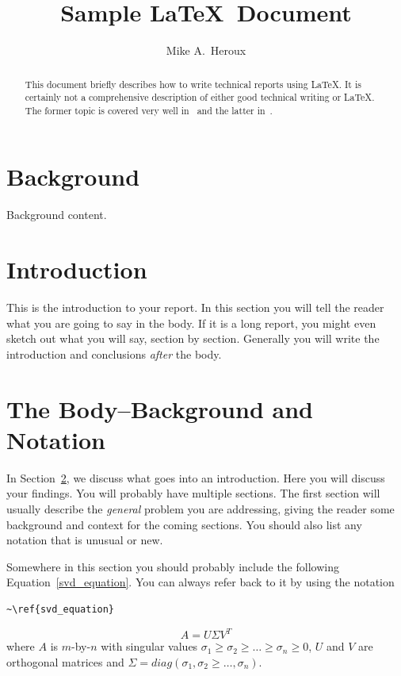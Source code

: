 \documentclass{IEEEtran}
\title{Sample \LaTeX\ Document}
\author{Mike A.~Heroux}
\date{}
\begin{document}

\maketitle
\pagestyle{plain}

\begin{abstract}
This document briefly describes how to write technical reports using \LaTeX.  It is certainly not a comprehensive description of either good technical writing or \LaTeX.  The former topic is covered very well in~\cite{High93} and the latter in~\cite{Lamp86}.
\end{abstract}

\section{Background}
Background content.

\section{Introduction}
\label{intro}
This is the introduction to your report.  In this section you will tell the reader what you are going to say in the body.  If it is a long report, you might even sketch out what you will say, section by section.  Generally you will write the introduction and conclusions {\it after} the body.

\section{The Body--Background and Notation}
In Section~\ref{intro}, we discuss what goes into an introduction.  Here you will discuss your findings.  You will probably have multiple sections.  The first section will usually describe the {\it general} problem you are addressing, giving the reader some background and context for the coming sections.  You should also list any notation that is unusual or new.

Somewhere in this section you should probably include the following Equation~\ref{svd_equation}.  You can always refer back to it by using the notation
\begin{verbatim}
~\ref{svd_equation}
\end{verbatim}

\begin{equation}
\label{svd_equation}
A = U \Sigma V^T
\end{equation}
where $A$ is $m$-by-$n$ with singular values $\sigma_1 \ge \sigma_2 \ge \ldots \ge \sigma_n \ge 0$, $U$ and $V$ are orthogonal matrices and $\Sigma = diag(\sigma_1,\sigma_2 \ge \ldots, \sigma_n)$.
\end{document}
